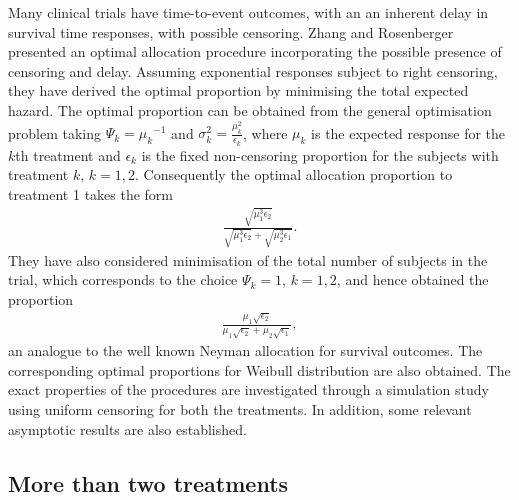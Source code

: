Many clinical trials have time-to-event outcomes, with an an inherent delay in survival time responses, with possible censoring. Zhang and
Rosenberger\cite{49} presented an optimal allocation procedure
incorporating the possible presence of censoring and delay.
Assuming exponential responses subject to right censoring, they have
derived the optimal proportion by minimising the total expected
hazard. The optimal proportion can be obtained from the general
optimisation problem taking $\Psi_{k}={\mu_{k}}^{-1}$ and
$\sigma_{k}^{2}=\frac{\mu_{k}^{2}}{\epsilon_{k}}$, where $\mu_{k}$
is the expected response for the $k$th treatment and $\epsilon_{k}$
is the fixed non-censoring proportion for the subjects with treatment $k$, $k=1,2$. Consequently the optimal allocation proportion to treatment 1 takes the form
\begin{eqnarray*}
\frac{\sqrt{\mu_{1}^{3}{\epsilon_{2}}}}{\sqrt{\mu_{1}^{3}{\epsilon_{2}}}+\sqrt{\mu_{2}^{3}{\epsilon_{1}}}}.
\end{eqnarray*}
They have also considered minimisation of the total number of
subjects in the trial, which corresponds to the choice $\Psi_{k}=1$, $k=1,2$, and hence obtained the proportion
\begin{eqnarray*}
\frac{\mu_{1}\sqrt{{\epsilon_{2}}}}{\mu_{1}\sqrt{{\epsilon_{2}}}+\mu_{2}\sqrt{{\epsilon_{1}}}},
\end{eqnarray*}
an analogue to the well known Neyman allocation for survival
outcomes. The corresponding optimal proportions for Weibull
distribution are also obtained. The exact properties of the
procedures are investigated through a simulation study using uniform
censoring for both the treatments. In addition, some relevant
asymptotic results are also established.

\subsection{More than two treatments}

